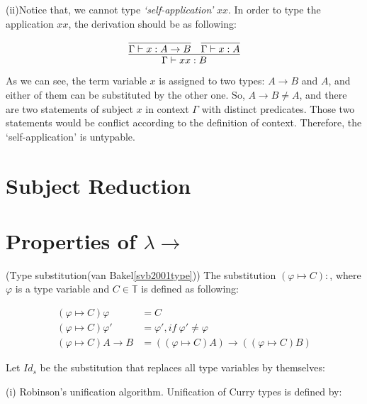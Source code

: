 (ii)Notice that, we cannot type \textit{`self-application'} $xx$. In order to type the application $xx$, the derivation should be as following:

$$
\infer{\Gamma \vdash xx:B}{
    \infer{\Gamma \vdash x:A \rightarrow B}{} 
    &
    \infer{\Gamma \vdash x:A}{}
}
$$


As we can see, the term variable $x$ is assigned to two types: $A \rightarrow B$ and $A$, and either of them can be substituted by the other one. So, $A \rightarrow B \neq A$, and there are two statements of subject $x$ in context $\Gamma$ with distinct predicates. Those two statements would be conflict according to the definition of context. Therefore, the `self-application' is untypable. 



\section{Subject Reduction}

\section{Properties of $\lambda \rightarrow $}

\begin{def1}
\normalfont (Type substitution(van Bakel\ref{svb2001type})) The substitution $(\varphi \mapsto C): $, where $\varphi$ is a type variable and $C \in \mathbb{T}$ is defined as following:
\end{def1}

\begin{equation*}
\begin{array}{ll}
(\varphi \mapsto C)\varphi        & = C\\
(\varphi \mapsto C)\varphi '      & = \varphi ',if\ \varphi '\neq \varphi\\
(\varphi \mapsto C)A\rightarrow B & = ((\varphi \mapsto C)A)\rightarrow ((\varphi \mapsto C)B)
\end{array}
\end{equation*}


\begin{def1}
\normalfont Let $Id_s$ be the substitution that replaces all type variables by themselves:
\end{def1}

\noindent (i) Robinson's unification algorithm. Unification of Curry types is defined by:

